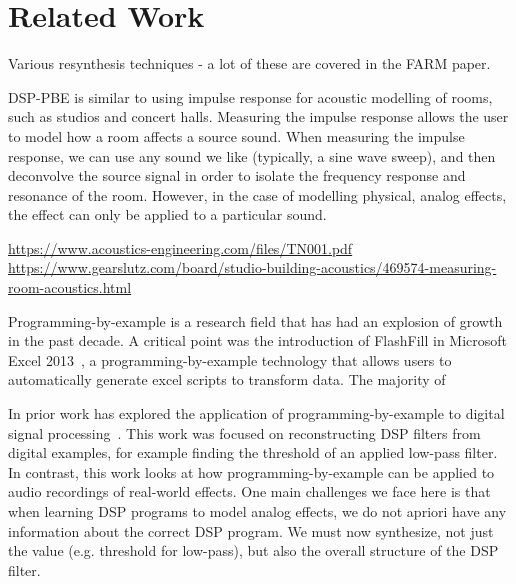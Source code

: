 \section{Related Work}

Various resynthesis techniques - a lot of these are covered in the FARM paper.

DSP-PBE is similar to using impulse response for acoustic modelling of rooms, such as studios and concert halls.
Measuring the impulse response allows the user to model how a room affects a source sound.
When measuring the impulse response, we can use any sound we like (typically, a sine wave sweep), and then deconvolve the source signal in order to isolate the frequency response and resonance of the room.
However, in the case of modelling physical, analog effects, the effect can only be applied to a particular sound.

\url{https://www.acoustics-engineering.com/files/TN001.pdf}
\url{https://www.gearslutz.com/board/studio-building-acoustics/469574-measuring-room-acoustics.html}

Programming-by-example is a research field that has had an explosion of growth in the past decade. 
A critical point was the introduction of FlashFill in Microsoft Excel 2013~\cite{GulwaniHS12}, a programming-by-example technology that allows users to automatically generate excel scripts to transform data.
The majority of

In prior work has explored the application of programming-by-example to digital signal processing~\cite{SantolucitoFARM}.
This work was focused on reconstructing DSP filters from digital examples, for example finding the threshold of an applied low-pass filter.
In contrast, this work looks at how programming-by-example can be applied to audio recordings of real-world effects.
One main challenges we face here is that when learning DSP programs to model analog effects, we do not apriori have any information about the correct DSP program.
We must now synthesize, not just the value (e.g. threshold for low-pass), but also the overall structure of the DSP filter.
